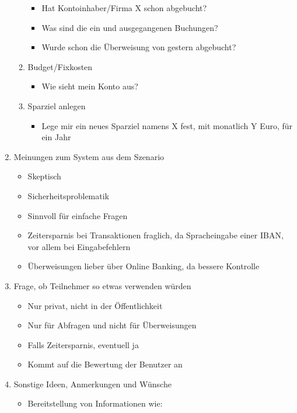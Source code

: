 \begin{enumerate}
\begin{enumerate}
\begin{itemize}
            \item Hat Kontoinhaber/Firma X schon abgebucht?
            \item Was sind die ein und ausgegangenen Buchungen?
            \item Wurde schon die Überweisung von gestern abgebucht?
        \end{itemize}
        \item Budget/Fixkosten
        \begin{itemize}
            \item Wie sieht mein Konto aus?
        \end{itemize}
        \item Sparziel anlegen
        \begin{itemize}
            \item Lege mir ein neues Sparziel namens X fest, mit monatlich Y Euro, für ein Jahr
        \end{itemize}
    \end{enumerate}
    \item Meinungen zum System aus dem Szenario
    \begin{itemize}
        \item Skeptisch
        \item Sicherheitsproblematik
        \item Sinnvoll für einfache Fragen
        \item Zeitersparnis bei Transaktionen fraglich, da Spracheingabe einer IBAN, vor allem bei Eingabefehlern 
        \item Überweisungen lieber über Online Banking, da bessere Kontrolle
    \end{itemize}
    \item Frage, ob Teilnehmer so etwas verwenden würden
    \begin{itemize}
        \item Nur privat, nicht in der Öffentlichkeit
        \item Nur für Abfragen und nicht für Überweisungen
        \item Falls Zeitersparnis, eventuell ja
        \item Kommt auf die Bewertung der Benutzer an
    \end{itemize}
    \item Sonstige Ideen, Anmerkungen und Wünsche
    \begin{itemize}
    \item Bereitstellung von Informationen wie: 
    \begin{itemize}

\end{itemize}
\end{itemize}
\end{enumerate}
